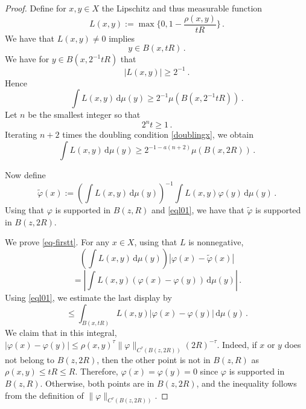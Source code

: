 \documentclass[10pt,a4paper]{article}
\theoremstyle{plain}
\theoremstyle{definition}
\numberwithin{equation}{subsection}
\newcommand{\leanok}{}
\begin{document}
\begin{proof}\leanok
    Define for $x,y\in X$ the Lipschitz and thus measurable function
    \begin{equation}
        L(x,y) := \max\{0, 1 - \frac{\rho(x,y)}{tR}\}\, .
    \end{equation}
We have that $L(x,y)\neq 0$ implies
\begin{equation}\label{eql01}
    y\in B(x, tR)\, .
\end{equation}
We have for $y\in B(x, 2^{-1}tR)$ that
\begin{equation}\label{eql30}
    |L(x,y)|\ge 2^{-1} \ .
\end{equation}
Hence
\begin{equation}
    \int L(x,y) \, \mathrm{d}\mu(y)\ge 2^{-1}\mu(B(x, 2^{-1}tR))\, .
\end{equation}
 Let $n$ be the smallest integer so that
 \begin{equation}\label{2nt1}
    2^n t\ge 1\, .
 \end{equation}
 Iterating $n+2$ times the doubling condition \eqref{doublingx}, we obtain
 \begin{equation}\label{eql32}
    \int L(x,y) \, \mathrm{d}\mu(y)\ge 2^{-1-a(n+2)}\mu(B(x, 2R))\, .
 \end{equation}

Now define
    $$
        \tilde \varphi(x) := \left(\int L(x,y) \, \mathrm{d}\mu(y)\right)^{-1}\int L(x,y) \varphi(y) \, \mathrm{d}\mu(y)\, .
    $$
Using that $\varphi$ is supported in $B(z,R)$ and
\eqref{eql01}, we have that $\tilde{\varphi}$ is supported in $B(z,2R)$.

We prove \eqref{eq-firstt}.
 For any $x\in X$, using that $L$ is nonnegative,
   \begin{equation}\label{eql1}
    \left(\int L(x,y) \, \mathrm{d}\mu(y)\right)
        |\varphi(x) - \tilde \varphi(x)|
    \end{equation}
 \begin{equation}\label{eql2}
 = \left| \int L(x,y)(\varphi(x) - \varphi(y)) \, \mathrm{d}\mu(y)\right|\, .
    \end{equation}
Using \eqref{eql01}, we estimate the last display by
 \begin{equation}\label{eql3}
         \le \int_{B(x, tR)} L(x,y)|\varphi(x) - \varphi(y)| \, \mathrm{d}\mu(y)\, .\end{equation}
We claim that in this integral, $|\varphi(x) - \varphi(y)|\le \rho(x,y)^\tau \|\varphi\|_{C^\tau(B(z, 2R))}(2R)^{-\tau}$.
Indeed, if $x$ or $y$ does not belong to $B(z, 2R)$, then the other point is not in $B(z,R)$ as $\rho(x,y)\le tR \le R$. Therefore,
$\varphi(x)=\varphi(y)=0$ since $\varphi$ is supported in $B (z, R)$. Otherwise, both points are in $B(z, 2R)$, and the inequality
follows from the definition of $\|\varphi\|_{C^\tau(B(z, 2R))}$.


\end{proof}
\end{document}
